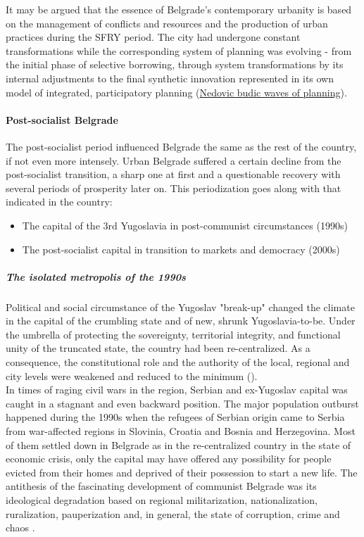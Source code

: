 \documentclass[11pt]{report}
\begin{document}
It may be argued that the essence of Belgrade's contemporary urbanity is based on the management of conflicts and resources and the production of urban practices during the SFRY period. The city had undergone constant transformations while the corresponding system of planning was evolving - from the initial phase of selective borrowing, through system transformations by its internal adjustments to the final synthetic innovation represented in its own model of integrated, participatory planning (\href{ref}{Nedovic budic waves of planning}).

\paragraph{Post-socialist Belgrade}

The post-socialist period influenced Belgrade the same as the rest of the country, if not even more intensely. Urban Belgrade suffered a certain decline from the post-socialist transition, a sharp one at first and a questionable recovery with several periods of prosperity later on. This periodization goes along with that indicated in the country:

\begin{itemize}
\item The capital of the 3rd Yugoslavia in post-communist circumstances (1990s)
\item The post-socialist capital in transition to markets and democracy (2000s)
\end{itemize}

\subparagraph{The isolated metropolis of the 1990s}

Political and social circumstance of the Yugoslav "break-up" changed the climate in the capital of the crumbling state and of new, shrunk Yugoslavia-to-be.
Under the umbrella of protecting the sovereignty, territorial integrity,  and functional unity of the truncated state, the country had been re-centralized.
As a consequence, the constitutional role and the authority of the local, regional and city levels were weakened and reduced to the minimum (\cite{Vujosevic 2015 Regionalizam u Srbiji 2}). 
\\

In times of raging civil wars in the region, Serbian and ex-Yugoslav capital was caught in a stagnant and even backward position.
The major population outburst happened during the 1990s when the refugees of Serbian origin came to Serbia from war-affected regions in Slovinia, Croatia and Bosnia and Herzegovina.
Most of them settled down in Belgrade as in the re-centralized country in the state of economic crisis, only the capital may have offered any possibility for people evicted from their homes and deprived of their possession to start a new life.
The antithesis of the fascinating development of communist Belgrade was its ideological  degradation  based  on regional militarization, nationalization, ruralization, pauperization and, in general, the state of corruption, crime and chaos \cite{ref}. 
\\
\end{document}
